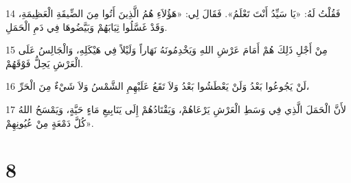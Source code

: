 \par 14 فَقُلْتُ لَهُ: «يَا سَيِّدُ أَنْتَ تَعْلَمُ». فَقَالَ لِي: «هَؤُلاَءِ هُمُ الَّذِينَ أَتُوا مِنَ الضِّيقَةِ الْعَظِيمَةِ، وَقَدْ غَسَّلُوا ثِيَابَهُمْ وَبَيَّضُوهَا فِي دَمِ الْحَمَلِ.
\par 15 مِنْ أَجْلِ ذَلِكَ هُمْ أَمَامَ عَرْشِ اللهِ وَيَخْدِمُونَهُ نَهَاراً وَلَيْلاً فِي هَيْكَلِهِ، وَالْجَالِسُ عَلَى الْعَرْشِ يَحِلُّ فَوْقَهُمْ.
\par 16 لَنْ يَجُوعُوا بَعْدُ وَلَنْ يَعْطَشُوا بَعْدُ وَلاَ تَقَعُ عَلَيْهِمِ الشَّمْسُ وَلاَ شَيْءٌ مِنَ الْحَرِّ،
\par 17 لأَنَّ الْحَمَلَ الَّذِي فِي وَسَطِ الْعَرْشِ يَرْعَاهُمْ، وَيَقْتَادُهُمْ إِلَى يَنَابِيعِ مَاءٍ حَيَّةٍ، وَيَمْسَحُ اللهُ كُلَّ دَمْعَةٍ مِنْ عُيُونِهِمْ».

\chapter{8}

